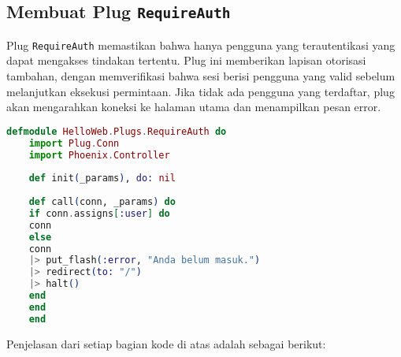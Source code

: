 \subsection{Membuat Plug \texttt{RequireAuth}}
Plug \texttt{RequireAuth} memastikan bahwa hanya pengguna yang terautentikasi yang dapat mengakses tindakan tertentu. Plug ini memberikan lapisan otorisasi tambahan, dengan memverifikasi bahwa sesi berisi pengguna yang valid sebelum melanjutkan eksekusi permintaan. Jika tidak ada pengguna yang terdaftar, plug akan mengarahkan koneksi ke halaman utama dan menampilkan pesan error.

\begin{lstlisting}[language=Elixir, caption={\texttt{lib/hello\_web/plugs/require\_auth.ex}}]
	defmodule HelloWeb.Plugs.RequireAuth do
	import Plug.Conn
	import Phoenix.Controller
	
	def init(_params), do: nil
	
	def call(conn, _params) do
	if conn.assigns[:user] do
	conn
	else
	conn
	|> put_flash(:error, "Anda belum masuk.")
	|> redirect(to: "/")
	|> halt()
	end
	end
	end
\end{lstlisting}

Penjelasan dari setiap bagian kode di atas adalah sebagai berikut:

